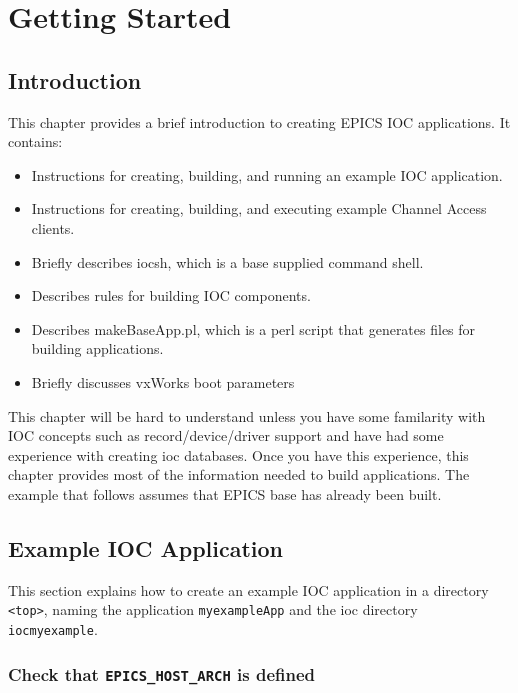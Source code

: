 \chapter{Getting Started}

\section{Introduction}

This chapter provides a brief introduction to creating EPICS IOC applications. It contains:

\begin{itemize}
\item Instructions for creating, building, and running an example IOC application.

\item Instructions for creating, building, and executing example Channel Access clients.

\item Briefly describes iocsh, which is a base supplied command shell.

\item Describes rules for building IOC components.

\item Describes makeBaseApp.pl, which is a perl script that generates files for building applications.

\item Briefly discusses vxWorks boot parameters
\end{itemize}

This chapter will be hard to understand unless you have some familarity with IOC concepts such as record/device/driver 
support and have had some experience with creating ioc databases. Once you have this experience, this chapter provides 
most of the information needed to build applications. The example that follows assumes that EPICS base has already been 
built.

\section{Example IOC Application}
\label{Example IOC Application}

This section explains how to create an example IOC application in a directory \verb|<top>|, naming the application 
\verb|myexampleApp| and the ioc directory \verb|iocmyexample|.

\subsection{Check that \texttt{EPICS\_HOST\_ARCH} is defined}

